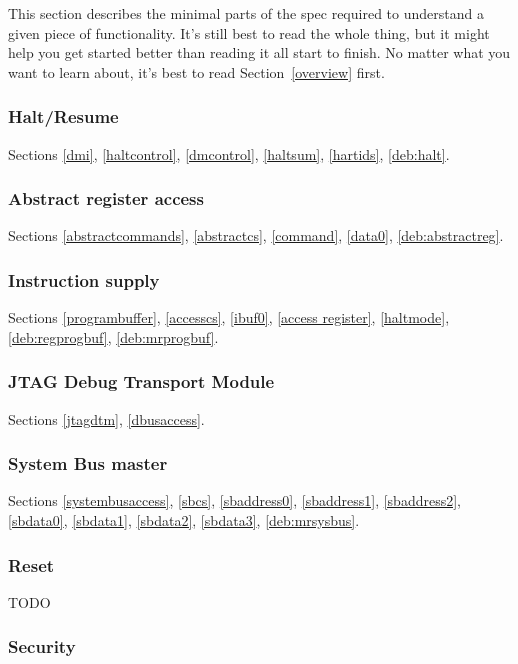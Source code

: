 \documentclass{article}
\begin{document}
This section describes the minimal parts of the spec required to understand a
given piece of functionality. It's still best to read the whole thing, but it
might help you get started better than reading it all start to finish. No
matter what you want to learn about, it's best to read Section~\ref{overview}
first.

\subsubsection{Halt/Resume}

Sections \ref{dmi}, \ref{haltcontrol}, \ref{dmcontrol}, \ref{haltsum},
\ref{hartids}, \ref{deb:halt}.

\subsubsection{Abstract register access}

Sections \ref{abstractcommands}, \ref{abstractcs}, \ref{command},
\ref{data0}, \ref{deb:abstractreg}.

\subsubsection{Instruction supply}

Sections \ref{programbuffer}, \ref{accesscs}, \ref{ibuf0}, \ref{access
register}, \ref{haltmode}, \ref{deb:regprogbuf}, \ref{deb:mrprogbuf}.

\subsubsection{JTAG Debug Transport Module}

Sections \ref{jtagdtm}, \ref{dbusaccess}.

\subsubsection{System Bus master}

Sections \ref{systembusaccess}, \ref{sbcs}, \ref{sbaddress0}, \ref{sbaddress1},
\ref{sbaddress2}, \ref{sbdata0}, \ref{sbdata1}, \ref{sbdata2}, \ref{sbdata3},
\ref{deb:mrsysbus}.

\subsubsection{Reset}

TODO

\subsubsection{Security}
\end{document}
